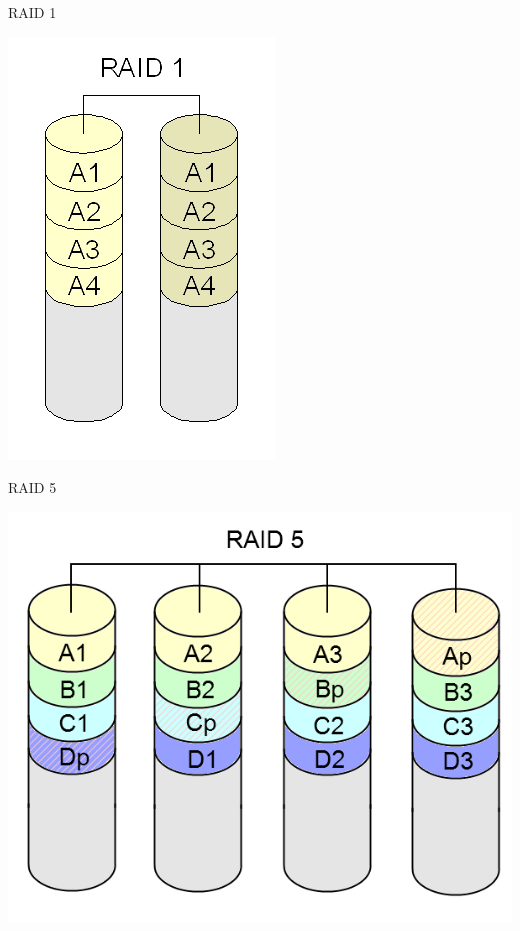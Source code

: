 \begin{frame}{RAID 1}
  
  \includegraphics[scale=.3]{raid1.png}

\end{frame}


\begin{frame}{RAID 5}
  
  \includegraphics[scale=.3]{raid5.png}

\end{frame}

